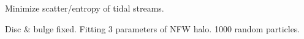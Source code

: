 Minimize scatter/entropy of tidal streams.

Disc \& bulge fixed. Fitting 3 parameters of NFW halo. 1000 random particles.